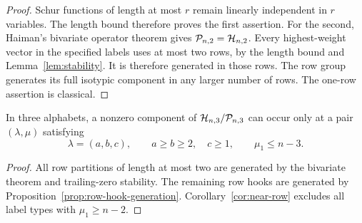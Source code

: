 \begin{proof}
Schur functions of length at most $r$ remain linearly
independent in $r$ variables.  The length bound therefore
proves the first assertion.
For the second, Haiman's bivariate operator theorem
\cite[Theorem~4.2]{Haiman} gives $\mathcal P_{n,2}=\mathcal H_{n,2}$.
Every highest-weight vector in the specified labels
uses at most two rows, by the length bound and
Lemma~\ref{lem:stability}.  It is therefore generated
in those rows.  The row group generates its full
isotypic component in any larger number of rows.
The one-row assertion is classical.
\end{proof}

\begin{corollary}\label{cor:three-row-defect}
In three alphabets, a nonzero component of
$\mathcal H_{n,3}/\mathcal P_{n,3}$ can occur only at a pair
$(\lambda,\mu)$ satisfying
\[
 \lambda=(a,b,c),\qquad a\geq b\geq2,\quad c\geq1,
 \qquad \mu_1\leq n-3.
\]
\end{corollary}

\begin{proof}
All row partitions of length at most two are generated
by the bivariate theorem and trailing-zero stability.
The remaining row hooks are generated by
Proposition~\ref{prop:row-hook-generation}.
Corollary~\ref{cor:near-row} excludes all label types
with $\mu_1\geq n-2$.
\end{proof}

